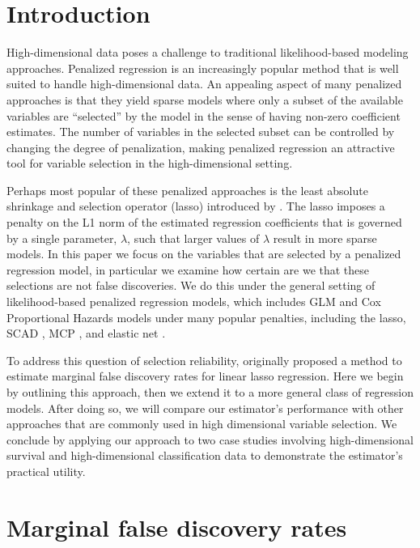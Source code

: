 \section{Introduction}

High-dimensional data poses a challenge to traditional likelihood-based modeling approaches.  Penalized regression is an increasingly popular method that is well suited to handle high-dimensional data.  An appealing aspect of many penalized approaches is that they yield sparse models where only a subset of the available variables are ``selected'' by the model in the sense of having non-zero coefficient estimates.  The number of variables in the selected subset can be controlled by changing the degree of penalization, making penalized regression an attractive tool for variable selection in the high-dimensional setting.

Perhaps most popular of these penalized approaches is the least absolute shrinkage and selection operator (lasso) introduced by \citet{tibshirani_1996}. The lasso imposes a penalty on the L1 norm of the estimated regression coefficients that is governed by a single parameter, $\lambda$, such that larger values of $\lambda$ result in more sparse models. In this paper we focus on the variables that are selected by a penalized regression model, in particular we examine how certain are we that these selections are not false discoveries. We do this under the general setting of likelihood-based penalized regression models, which includes GLM and Cox Proportional Hazards models under many popular penalties, including the lasso, SCAD \citep{SCAD}, MCP \citep{MCP}, and elastic net \citep{Elastic_Net}.

To address this question of selection reliability, \citet{Breheny2017} originally proposed a method to estimate marginal false discovery rates for linear lasso regression. Here we begin by outlining this approach, then we extend it to a more general class of regression models.  After doing so, we will compare our estimator's performance with other approaches that are commonly used in high dimensional variable selection.  We conclude by applying our approach to two case studies involving high-dimensional survival and high-dimensional classification data to demonstrate the estimator's practical utility.

\section{Marginal false discovery rates}

